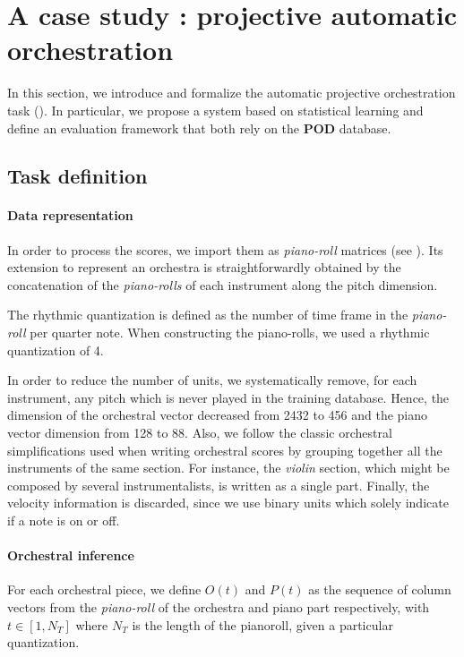 \documentclass[twoside,twocolumn]{article}
\begin{document}
\section{A case study : projective automatic orchestration}

In this section, we introduce and formalize the automatic projective orchestration task (). In particular, we propose a system based on statistical learning and define an evaluation framework that both rely on the \textbf{POD} database.

\subsection{Task definition}
\paragraph{Data representation}
In order to process the scores, we import them as \textit{piano-roll} matrices (see ). 
Its extension to represent an orchestra is straightforwardly obtained by the concatenation of the \textit{piano-rolls} of each instrument along the pitch dimension.

The rhythmic quantization is defined as the number of time frame in the \textit{piano-roll} per quarter note. When constructing the piano-rolls, we used a rhythmic quantization of 4.

In order to reduce the number of units, we systematically remove, for each instrument, any pitch which is never played in the training database. Hence, the dimension of the orchestral vector decreased from 2432 to 456 and the piano vector dimension from 128 to 88.
Also, we follow the classic orchestral simplifications used when writing orchestral scores by grouping together all the instruments of the same section. For instance, the \textit{violin} section, which might be composed by several instrumentalists, is written as a single part.
Finally, the velocity information is discarded, since we use binary units which solely indicate if a note is on or off.

\paragraph{Orchestral inference}
For each orchestral piece, we define $O(t)$ and $P(t)$ as the sequence of column vectors from the \textit{piano-roll} of the orchestra and piano part respectively, with $t \in \left[ 1,N_{T} \right]$ where $N_{T}$ is the length of the pianoroll, given a particular quantization.
\end{document}
